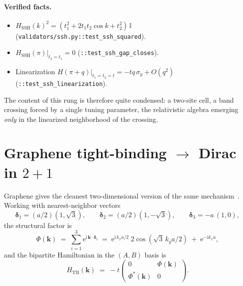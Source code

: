 \documentclass[a4paper,onecolumn,11pt]{quantumarticle}
\newcommand{\ii}{\ensuremath{\mathrm{i}}}
\newcommand{\bbI}{\ensuremath{\mathbb{I}}}
\def\vk{\ensuremath{\bm{k}}}
\def\vdelta{\ensuremath{\bm{\delta}}}
\newcommand{\Hop}{\ensuremath{H}}
\begin{document}
\paragraph{Verified facts.}
\begin{itemize}[leftmargin=*]
  \item $\Hop_{\mathrm{SSH}}(k)^{2}=(t_1^{2}+2 t_1 t_2 \cos k + t_2^{2})\,\bbI$
    (\texttt{validators/ssh.py::test\_ssh\_squared}).
  \item $\Hop_{\mathrm{SSH}}(\pi)\big|_{t_2=t_1}=0$
    (\texttt{::test\_ssh\_gap\_closes}).
  \item Linearization $\Hop(\pi+q)\big|_{t_1=t_2=t}=-tq\,\sigma_y+O(q^2)$
    (\texttt{::test\_ssh\_linearization}).
\end{itemize}

The content of this rung is therefore quite condensed: a
two-site cell, a band crossing forced by a single tuning parameter, the
relativistic algebra emerging \emph{only} in the linearized neighborhood
of the crossing.


\section{Graphene tight-binding \texorpdfstring{$\rightarrow$}{->} Dirac in \texorpdfstring{$2{+}1$}{(2+1)}}
\label{p:graphene}

Graphene gives the cleanest two-dimensional version of the same mechanism~\cite{Semenoff1984,CastroNeto2009}. Working with
nearest-neighbor vectors
\[
\vdelta_1 = (a/2)(1,\sqrt{3}),\qquad
\vdelta_2 = (a/2)(1,-\sqrt{3}),\qquad
\vdelta_3 = -a\,(1,0) ,
\]
the structural factor is
\begin{equation}
\Phi(\vk) \;=\;
\sum_{i=1}^{3} \mathrm{e}^{\ii\,\vk\cdot\vdelta_{i}}
\;=\; \mathrm{e}^{\ii\,k_x a/2}\;2\cos(\sqrt{3}\,k_y a / 2)
  \;+\; \mathrm{e}^{-\ii k_x a},
\label{p:eq:Phi}
\end{equation}
and the bipartite Hamiltonian in the $(A,B)$ basis is
\begin{equation}
\Hop_{\mathrm{TB}}(\vk) \;=\; -t\!\begin{pmatrix} 0 & \Phi(\vk) \\ \Phi^{*}(\vk) & 0 \end{pmatrix}.
\end{equation}
\end{document}
